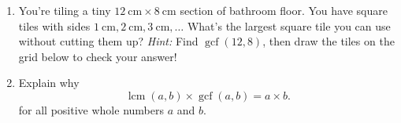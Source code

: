 \documentclass[12pt]{article}
\DeclareMathOperator{\lcm}{lcm}
\DeclareMathOperator{\gcf}{gcf}
\newcounter{exercisenum}
\newenvironment{exercises}{%
  \begin{tcolorbox}[colback=white,colframe=black,arc=0pt,breakable]
  \begin{enumerate}[label=\arabic*),leftmargin=1cm,resume=exercises]
  \setcounter{enumi}{\value{exercisenum}}
}{%
  \setcounter{exercisenum}{\value{enumi}}
  \end{enumerate}
  \end{tcolorbox}
}
\begin{document}
\begin{exercises}
\item
You're tiling a tiny $\SI{12}{\centi\meter} \times \SI{8}{\centi\meter}$ section of bathroom floor. You have square tiles with sides $\SI{1}{\centi\meter}, \SI{2}{\centi\meter}, \SI{3}{\centi\meter}, \ldots$ What's the largest square tile you can use without cutting them up? \textit{Hint:} Find $\gcf(12, 8)$, then draw the tiles on the grid below to check your answer!
\begin{center}
\end{center}
\item
Explain why 
$$
\lcm(a,b)\times\gcf(a,b) = a\times b.
$$
for all positive whole numbers $a$ and $b$. 
\end{exercises}
\end{document}
